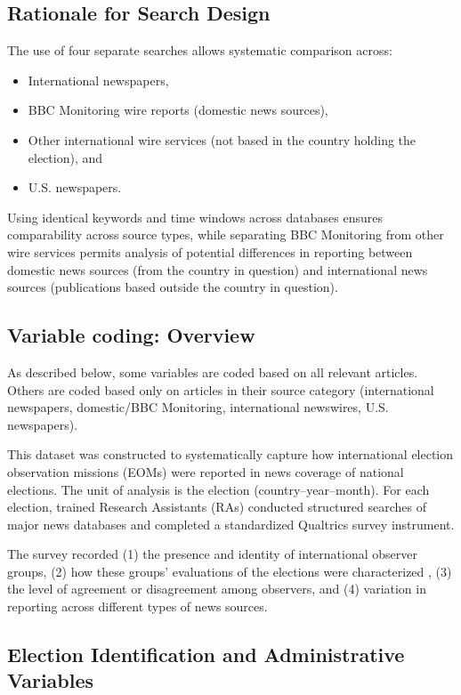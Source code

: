 \documentclass[USletter,12pt, titlepage]{article} %
\begin{document}
\subsection{Rationale for Search Design}

The use of four separate searches allows systematic comparison across:

\begin{itemize}
    \item International newspapers,
    \item BBC Monitoring wire reports (domestic news sources),
    \item Other international wire services (not based in the country holding the election), and
    \item U.S. newspapers.
\end{itemize}

Using identical keywords and time windows across databases ensures comparability across source types, while separating BBC Monitoring from other wire services permits analysis of potential differences in reporting between domestic news sources (from the country in question) and international news sources (publications based outside the country in question).

\subsection{Variable coding: Overview}

As described below, some variables are coded based on all relevant articles. Others are coded based only on articles in their source category (international newspapers, domestic/BBC Monitoring, international newswires, U.S. newspapers). 

This dataset was constructed to systematically capture how international election observation missions (EOMs) were reported in news coverage of national elections. The unit of analysis is the election (country--year--month). For each election, trained Research Assistants (RAs) conducted structured searches of major news databases and completed a standardized Qualtrics survey instrument.

The survey recorded (1) the presence and identity of international observer groups,  (2) how these groups’ evaluations of the elections were characterized , (3) the level of agreement or disagreement among observers, and (4) variation in reporting across different types of news sources.

\subsection{Election Identification and Administrative Variables}
\end{document}
